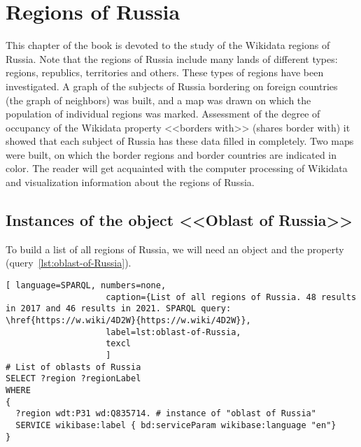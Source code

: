 \chapter{Regions of Russia}
\label{ch:oblast-of-Russia}


This chapter of the book is devoted to the study of the Wikidata regions of Russia. 
Note that the regions of Russia include many lands of different
types: regions, republics, territories and others. 
These types of regions have been investigated. 
A graph of the subjects of Russia bordering 
on foreign countries (the graph of neighbors) was built, and a map was drawn
on which the population of individual regions was marked. Assessment
of the degree of occupancy of the Wikidata property <<borders with>> (shares border with) 
it showed that each subject of Russia has these data filled in completely. Two maps were built, on which the border regions and border countries are indicated in color.
The reader will get acquainted with the computer processing of Wikidata and visualization 
information about the regions of Russia.

\label{question:q_subjects_of_Russia_3}

\section{Instances of the object <<Oblast of Russia>>}

To build a list of all regions of Russia, we will need an object 
 and the property 
(query~\ref{lst:oblast-of-Russia}).

\begin{lstlisting}[ language=SPARQL, numbers=none,
                    caption={List of all regions of Russia. 48 results in 2017 and 46 results in 2021. SPARQL query: \href{https://w.wiki/4D2W}{https://w.wiki/4D2W}},
                    label=lst:oblast-of-Russia,
                    texcl 
                    ]
# List of oblasts of Russia
SELECT ?region ?regionLabel
WHERE
{
  ?region wdt:P31 wd:Q835714. # instance of "oblast of Russia"
  SERVICE wikibase:label { bd:serviceParam wikibase:language "en"}
}
\end{lstlisting}%

